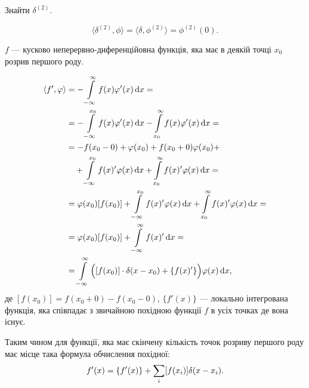 \begin{example}
	Знайти $\delta^{(2)}$.
\end{example}

\begin{solution}
	\begin{equation}
		\langle \delta^{(2)}, \phi \rangle = \langle \delta, \phi^{(2)} \rangle = \phi^{(2)}(0).
	\end{equation}
\end{solution}

\begin{example}
	$f$ --- кусково неперервно-диференційовна функція, яка має в деякій точці $x_0$ розрив першого роду.
\end{example}

\begin{solution}
	\begin{equation}
		\begin{aligned}
			\langle f', \phi \rangle &= - \Int_{-\infty}^\infty f(x) \phi'(x) \diff x = \\
			&= - \Int_{-\infty}^{x_0} f(x) \phi'(x) \diff x -\Int_{x_0}^\infty f(x) \phi'(x) \diff x = \\
			&= - f(x_0 - 0) + \phi(x_0) + f(x_0 + 0) \phi(x_0) + \\
			&\quad + \Int_{-\infty}^{x_0} f(x)' \phi(x) \diff x + \Int_{x_0}^\infty f(x)' \phi(x) \diff x = \\
			&= \phi(x_0) [f(x_0)] + \Int_{-\infty}^{x_0} f(x)' \phi(x) \diff x + \Int_{x_0}^\infty f(x)' \phi(x) \diff x = \\
			&= \phi(x_0) [f(x_0)] + \Int_{-\infty}^\infty f(x)' \diff x  = \\
			&= \Int_{-\infty}^\infty \Big( [f(x_0)] \cdot \delta(x - x_0) + \{f(x)'\} \Big) \phi(x) \diff x,
		\end{aligned}
	\end{equation}
	де $[f(x_0)] = f(x_0 + 0) - f(x_0 - 0)$, $\{f'(x)\}$ --- локально інтегрована функція, яка співпадає з звичайною похідною функції $f$ в усіх точках де вона існує.
\end{solution}

\begin{remark}
	Таким чином для функції, яка має скінчену кількість точок розриву першого роду має місце така формула обчислення похідної:
	\begin{equation}
		f'(x) = \{f'(x)\} + \displaystyle\sum\limits_{i} [f(x_i)] \delta (x - x_i).
	\end{equation}
\end{remark}


